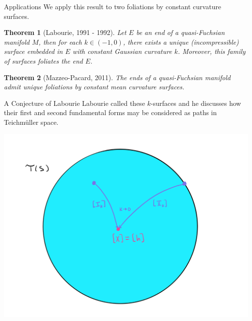 \documentclass[professionalfont]{beamer}
\newtheorem*{thm*}{Theorem}
\begin{document}


\begin{frame}{Applications}
We apply this result to two foliations by constant curvature surfaces.
\newline \pause
	
	\begin{thm*}[Labourie, 1991 - 1992]
Let $E$ be an end of a quasi-Fuchsian manifold $M$, then for each $k \in (-1,0)$, there exists a unique (incompressible) surface embedded in $E$ with constant Gaussian curvature $k$. Moreover, this family of surfaces foliates the end $E$.
\end{thm*}\pause

\vspace{0.5cm}

\begin{thm*}[Mazzeo-Pacard, 2011]
The ends of a quasi-Fuchsian manifold admit unique foliations by constant mean curvature surfaces. 
\end{thm*}

	
\end{frame}




%
%
%
%




\begin{frame}{A Conjecture of Labourie}
Labourie called these $k$-surfaces and he discusses how their first and second fundamental forms may be considered as paths in Teichm\"uller space.

\begin{center}
\includegraphics[scale=0.07]{Teich-paths.jpg}
\end{center}


\end{frame}
\end{document}
